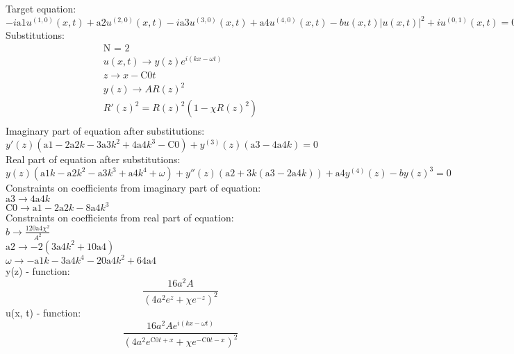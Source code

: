 \documentclass[12pt,a4paper,draft]{article}
\begin{document}
Target equation:
\\$
-i \text{a1} u^{(1,0)}(x,t)+\text{a2} u^{(2,0)}(x,t)-i \text{a3} u^{(3,0)}(x,t)+\text{a4} u^{(4,0)}(x,t)-b u(x,t) \left| u(x,t)\right| ^2+i u^{(0,1)}(x,t)=0
$\\
Substitutions:
$$
\begin{array}{c}
 \text{N = 2} \\
 u(x,t)\to y(z) e^{i (k x-\omega  t)} \\
 z\to x-\text{C0} t \\
 y(z)\to A R(z)^2 \\
 R'(z)^2=R(z)^2 \left(1-\chi  R(z)^2\right) \\
\end{array}
$$
Imaginary part of equation after substitutions:
\\$
y'(z) \left(\text{a1}-2 \text{a2} k-3 \text{a3} k^2+4 \text{a4} k^3-\text{C0}\right)+y^{(3)}(z) (\text{a3}-4 \text{a4} k)=0
$\\
Real part of equation after substitutions:
\\$
y(z) \left(\text{a1} k-\text{a2} k^2-\text{a3} k^3+\text{a4} k^4+\omega \right)+y''(z) (\text{a2}+3 k (\text{a3}-2 \text{a4} k))+\text{a4} y^{(4)}(z)-b y(z)^3=0
$\\
Constraints on coefficients from imaginary part of equation:
\\$\text{a3}\to 4 \text{a4} k$\\
$\text{C0}\to \text{a1}-2 \text{a2} k-8 \text{a4} k^3$\\
Constraints on coefficients from real part of equation:
\\$b\to \frac{120 \text{a4} \chi ^2}{A^2}$\\
$\text{a2}\to -2 \left(3 \text{a4} k^2+10 \text{a4}\right)$\\
$\omega \to -\text{a1} k-3 \text{a4} k^4-20 \text{a4} k^2+64 \text{a4}$\\


y(z) - function:
$$
\frac{16 a^2 A}{\left(4 a^2 e^z+\chi  e^{-z}\right)^2}
$$
u(x, t) - function:
$$
\frac{16 a^2 A e^{i (k x-\omega  t)}}{\left(4 a^2 e^{\text{C0} t+x}+\chi  e^{-\text{C0} t-x}\right)^2}
$$
\end{document}
